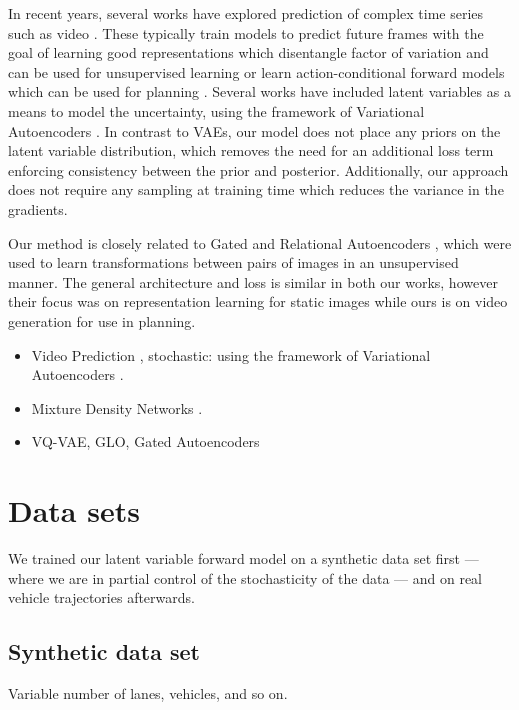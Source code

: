 \documentclass{article}
\begin{document}
In recent years, several works have explored prediction of complex time series such as video \citep{mathieu-iclr-2016}.
These typically train models to predict future frames with the goal of learning good representations which disentangle factor of variation and can be used for unsupervised learning \citep{Srivastava15, Villegas17, DentonB17} or learn action-conditional forward models which can be used for planning \citep{Oh15, FinnGL16, Poke, VideoPixel}.
Several works have included latent variables as a means to model the uncertainty, using the framework of Variational Autoencoders \citep{Babaeizadeh2018, Denton2018}.
In contrast to VAEs, our model does not place any priors on the latent variable distribution, which removes the need for an additional loss term enforcing consistency between the prior and posterior.
Additionally, our approach does not require any sampling at training time which reduces the variance in the gradients.

Our method is closely related to Gated and Relational Autoencoders \citep{RelationalAE, GAE}, which were used to learn transformations between pairs of images in an unsupervised manner.
The general architecture and loss is similar in both our works, however their focus was on representation learning for static images while ours is on video generation for use in planning.

\begin{itemize}
\item Video Prediction \citep{mathieu-iclr-2016}, stochastic:  using the framework of Variational Autoencoders \citep{VAE}.
\item Mixture Density Networks \citep{mixture-density-networks}.
\item VQ-VAE, GLO, Gated Autoencoders
\end{itemize}


\section{Data sets}
We trained our latent variable forward model on a synthetic data set first --- where we are in partial control of the stochasticity of the data --- and on real vehicle trajectories afterwards.

\subsection{Synthetic data set}
Variable number of lanes, vehicles, and so on.  %
\end{document}
